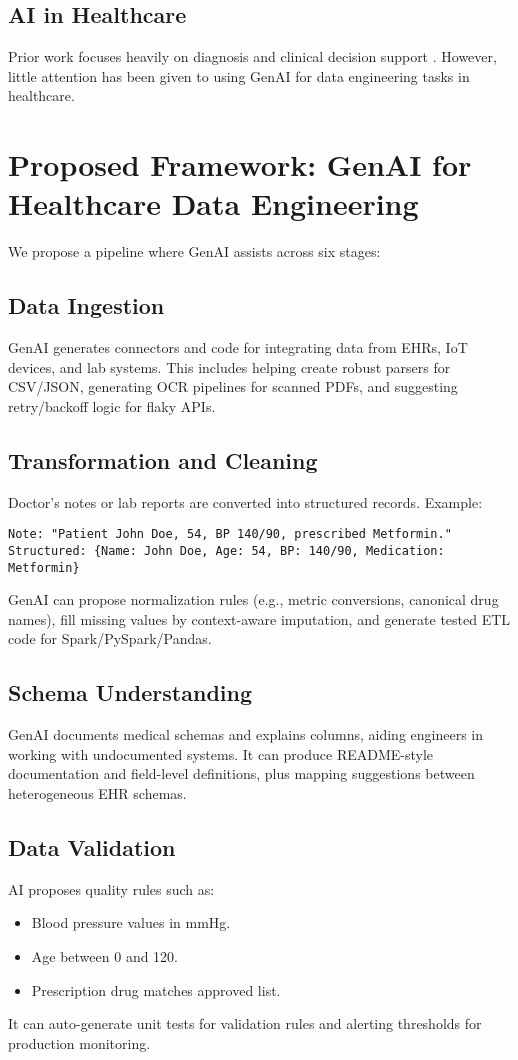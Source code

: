 \documentclass[conference]{IEEEtran}
\begin{document}
\subsection{AI in Healthcare}
Prior work focuses heavily on diagnosis and clinical decision support \cite{rajpurkar2022aihealthcare}. However, little attention has been given to using GenAI for data engineering tasks in healthcare.

\section{Proposed Framework: GenAI for Healthcare Data Engineering}
We propose a pipeline where GenAI assists across six stages:

\subsection{Data Ingestion}
GenAI generates connectors and code for integrating data from EHRs, IoT devices, and lab systems. This includes helping create robust parsers for CSV/JSON, generating OCR pipelines for scanned PDFs, and suggesting retry/backoff logic for flaky APIs.

\subsection{Transformation and Cleaning}
Doctor’s notes or lab reports are converted into structured records. Example:
\begin{verbatim}
Note: "Patient John Doe, 54, BP 140/90, prescribed Metformin."
Structured: {Name: John Doe, Age: 54, BP: 140/90, Medication: Metformin}
\end{verbatim}
GenAI can propose normalization rules (e.g., metric conversions, canonical drug names), fill missing values by context-aware imputation, and generate tested ETL code for Spark/PySpark/Pandas.

\subsection{Schema Understanding}
GenAI documents medical schemas and explains columns, aiding engineers in working with undocumented systems. It can produce README-style documentation and field-level definitions, plus mapping suggestions between heterogeneous EHR schemas.

\subsection{Data Validation}
AI proposes quality rules such as:
\begin{itemize}
    \item Blood pressure values in mmHg.
    \item Age between 0 and 120.
    \item Prescription drug matches approved list.
\end{itemize}
It can auto-generate unit tests for validation rules and alerting thresholds for production monitoring.
\end{document}
